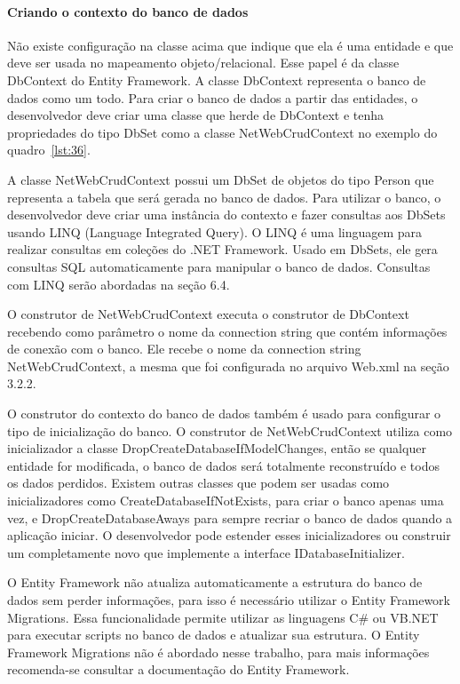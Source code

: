 \documentclass[a4paper,12pt]{article}
\newcommand{\sharpcode}[3] {
	
	\FloatBarrier
}
\begin{document}
\paragraph{Criando o contexto do banco de dados}

Não existe configuração na classe acima que indique que ela é uma entidade e que deve ser usada no mapeamento objeto/relacional. Esse papel é da classe DbContext do Entity Framework. A classe DbContext representa o banco de dados como um todo. Para criar o banco de dados a partir das entidades, o desenvolvedor deve criar uma classe que herde de DbContext e tenha propriedades do tipo DbSet como a classe NetWebCrudContext no exemplo do quadro~\ref{lst:36}. 

\sharpcode{code/36.txt}{Classe NetWebCrudContext representa o contexto do banco de dados}{lst:36}

A classe NetWebCrudContext possui um DbSet de objetos do tipo Person que representa a tabela que será gerada no banco de dados. Para utilizar o banco, o desenvolvedor deve criar uma instância do contexto e fazer consultas aos DbSets usando LINQ (Language Integrated Query). O LINQ é uma linguagem para realizar consultas em coleções do .NET Framework. Usado em DbSets, ele gera consultas SQL automaticamente para manipular o banco de dados. Consultas com LINQ serão abordadas na seção 6.4.

O construtor de NetWebCrudContext executa o construtor de DbContext recebendo como parâmetro o nome da connection string que contém informações de conexão com o banco. Ele recebe o nome da connection string NetWebCrudContext, a mesma que foi configurada no arquivo Web.xml na seção 3.2.2.

O construtor do contexto do banco de dados também é usado para configurar o tipo de inicialização do banco. O construtor de NetWebCrudContext utiliza como inicializador a classe DropCreateDatabaseIfModelChanges, então se qualquer entidade for modificada, o banco de dados será totalmente reconstruído e todos os dados perdidos. Existem outras classes que podem ser usadas como inicializadores como CreateDatabaseIfNotExists, para criar o banco apenas uma vez, e DropCreateDatabaseAways para sempre recriar o banco de dados quando a aplicação iniciar. O desenvolvedor pode estender esses inicializadores ou construir um completamente novo que implemente a interface IDatabaseInitializer.

O Entity Framework não atualiza automaticamente a estrutura do banco de dados sem perder informações, para isso é necessário utilizar o Entity Framework Migrations. Essa funcionalidade permite utilizar as linguagens C\# ou VB.NET para executar scripts no banco de dados e atualizar sua estrutura. O Entity Framework Migrations não é abordado nesse trabalho, para mais informações recomenda-se consultar a documentação do Entity Framework.
\end{document}
